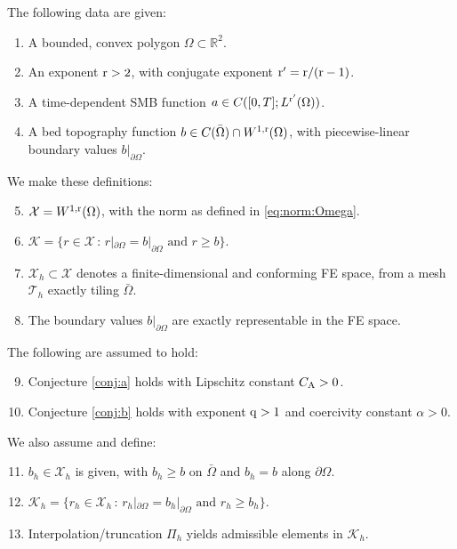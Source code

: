 \documentclass[hidelinks,onefignum,onetabnum,final]{siamart220329}  %
\newcommand{\RR}{\mathbb{R}}
\newcommand{\cK}{\mathcal{K}}
\newcommand{\cT}{\mathcal{T}}
\newcommand{\cX}{\mathcal{X}}
\newcommand{\qq}{{\text{\textnormal{q}}}}
\newcommand{\rr}{{\text{\textnormal{r}}}}
\newcommand{\CA}{C_\text{\textnormal{A}}}
\begin{document}
\smallskip
\begin{assumptions}
The following data are given:
\begin{enumerate}
\item A bounded, convex polygon $\Omega\subset\RR^2$.
\item An exponent $\rr > 2$, with conjugate exponent $\rr' = \rr/(\rr-1)$. \label{item:rr}
\item A time-dependent SMB function $a\in C([0,T]; L^{\rr'}(\Omega))$.
\item A bed topography function $b \in C(\bar\Omega) \cap W^{1,\rr}(\Omega)$, with piecewise-linear boundary values $b|_{\partial\Omega}$.
\end{enumerate}
We make these definitions:
\begin{enumerate}
\setcounter{enumi}{4}
\item $\cX = W^{1,\rr}(\Omega)$, with the norm as defined in \eqref{eq:norm:Omega}.
\item $\cK = \{r\in\cX\,:\,r|_{\partial \Omega} = b|_{\partial \Omega} \text{ and } r \ge b\}$.
\item $\cX_h \subset \cX$ denotes a finite-dimensional and conforming FE space, from a mesh $\cT_h$ exactly tiling $\bar\Omega$.
\item The boundary values $b|_{\partial\Omega}$ are exactly representable in the FE space.
\end{enumerate}
The following are assumed to hold:
\begin{enumerate}
\setcounter{enumi}{8}
\item Conjecture \ref{conj:a} holds with Lipschitz constant $\CA > 0$. \label{item:conj:a}
\item Conjecture \ref{conj:b} holds with exponent $\qq>1$ and coercivity constant $\alpha > 0$.\label{item:conj:b}
\end{enumerate}
We also assume and define:
\begin{enumerate}
\setcounter{enumi}{10}
\item $b_h\in\cX_h$ is given, with $b_h\ge b$ on $\bar\Omega$ and $b_h=b$ along $\partial \Omega$. \label{item:goodbh}
\item $\cK_h = \{r_h\in\cX_h\,:\,r_h|_{\partial \Omega} = b_h|_{\partial \Omega} \text{ and } r_h \ge b_h\}$. \label{item:defineKh}
\item Interpolation/truncation $\Pi_h$ yields admissible elements in $\cK_h$.  \label{item:Pi}
\end{enumerate}
\end{assumptions}
\end{document}
